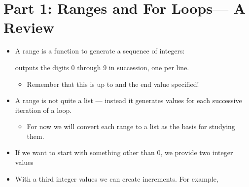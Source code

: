 \documentclass[letterpaper,10pt,english]{sphinxmanual}
\begin{document}
\section{Part 1: Ranges and For Loops— A Review}
\label{\detokenize{lecture_notes/lec12_loops2_for_double:part-1-ranges-and-for-loops-a-review}}\begin{itemize}
\item {} 
A range is a function to generate a sequence of integers:

%
\begin{sphinxVerbatim}[commandchars=\\\{\}]
   
\end{sphinxVerbatim}

outputs the digits 0 through 9 in succession, one per line.
\begin{itemize}
\item {} 
Remember that this is up to and  the end
value specified!

\end{itemize}

\item {} 
A range is not quite a list — instead it generates values for each
successive iteration of a  loop.
\begin{itemize}
\item {} 
For now we will convert each range to a list as the basis for
studying them.

\end{itemize}

\item {} 
If we want to start with something other than 0, we provide two
integer values

%
\begin{sphinxVerbatim}[commandchars=\\\{\}]
\end{sphinxVerbatim}

\item {} 
With a third integer values we can create increments. For example,

%
\begin{sphinxVerbatim}[commandchars=\\\{\}]
\end{sphinxVerbatim}


\end{itemize}
\end{document}
